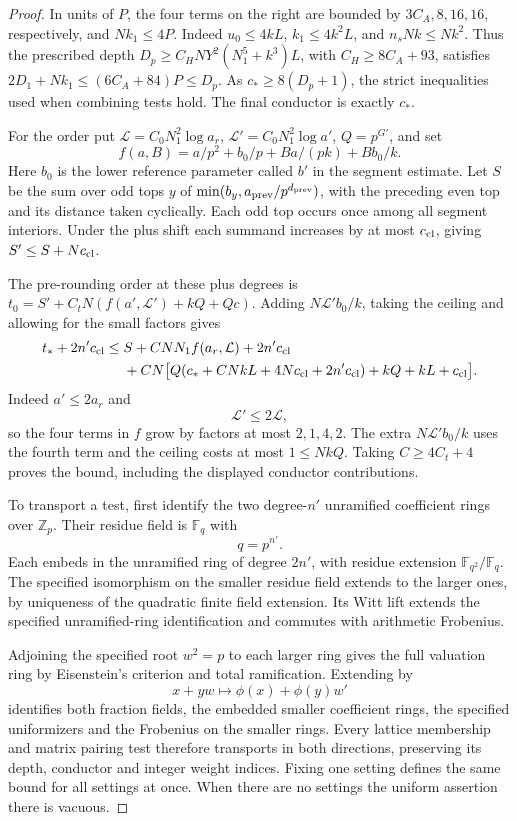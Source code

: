 \begin{proof}
In units of \(P\), the four terms on the right are bounded by
\(3C_A,8,16,16\), respectively, and \(Nk_1\le4P\).
Indeed \(u_0\le4kL\), \(k_1\le4k^2 L\), and
\(n_sN k\le Nk^2\). Thus the prescribed depth
\(D_p\ge C_H NY^2(N_1^5+k^3)L\), with \(C_H\ge8C_A+93\),
satisfies \(2D_1+Nk_1\le(6C_A+84)P\le D_p\).
As \(c_*\ge8(D_p+1)\), the strict inequalities used when
combining tests hold. The final conductor is exactly \(c_*\).

For the order put \(\mathcal L=C_0N_1^2\log a_r\),
\(\mathcal L'=C_0N_1^2\log a'\), \(Q=p^{G'}\), and set
\[
 f(a,B)=a/p^2+b_0/p+Ba/(pk)+Bb_0/k.
\]
Here \(b_0\) is the lower reference parameter called \(b'\) in
the segment estimate. Let \(S\) be the sum over odd tops \(y\)
of \(\min(b_y,a_{\rm prev}/p^{d_{\rm prev}})\), with the
preceding even top and its distance taken cyclically. Each odd
top occurs once among all segment interiors. Under the plus
shift each summand increases by at most \(c_{\rm cl}\), giving
\(S'\le S+Nc_{\rm cl}\).

The pre-rounding order at these plus
degrees is \(t_0=S'+C_tN(f(a',\mathcal L')+kQ+Qc)\).
Adding \(N\mathcal L' b_0/k\), taking the ceiling and allowing
for the small factors gives
\begin{align*}
 t_*+2n'c_{\rm cl}\le{}&S+C NN_1 f(a_r,\mathcal L)+2n'c_{\rm cl}\\
 &+CN\big[Q(c_*+CNkL+4Nc_{\rm cl}+2n'c_{\rm cl})
                      +kQ+kL+c_{\rm cl}\big].
\end{align*}
Indeed \(a'\le2a_r\) and
\[
 \mathcal L'\le2\mathcal L,
\]
so the
four terms in \(f\) grow by factors at most \(2,1,4,2\).
The extra \(N\mathcal L'b_0/k\) uses the fourth term and the
ceiling costs at most \(1\le NkQ\). Taking \(C\ge4C_t+4\) proves
the bound, including the displayed conductor contributions.

To transport a test, first identify the two degree-\(n'\)
unramified coefficient rings over \(\mathbb Z_p\). Their residue
field is \(\mathbb F_q\) with
\[
 q=p^{n'}.
\]
Each embeds in the
unramified ring of degree \(2n'\), with residue extension
\(\mathbb F_{q^2}/\mathbb F_q\). The specified isomorphism
on the smaller residue field extends to the larger ones, by
uniqueness of the quadratic finite field extension. Its Witt
lift extends the specified unramified-ring identification and
commutes with arithmetic Frobenius.

Adjoining the specified
root \(w^2=p\) to each larger ring gives the full valuation
ring by Eisenstein's criterion and total ramification. Extending
by
\[
 x+yw\mapsto\phi(x)+\phi(y)w'
\]
identifies both fraction
fields, the embedded smaller coefficient rings, the specified
uniformizers and the Frobenius on the smaller rings. Every
lattice membership and matrix pairing test therefore transports
in both directions, preserving its depth, conductor and integer
weight indices. Fixing one setting defines the same bound for
all settings at once. When there are no settings the uniform
assertion there is vacuous.


\end{proof}
